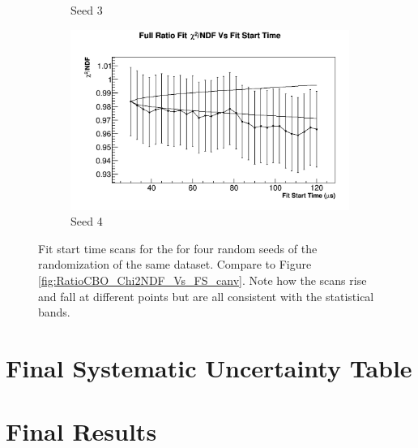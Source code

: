 \begin{figure}[]
\begin{subfigure}[t]{0.45\textwidth}
	    \caption{Seed 3}
    \end{subfigure}
    \begin{subfigure}[t]{0.45\textwidth}
	    \centering
		\includegraphics[width=\textwidth]{RatioCBO_Chi2NDF_Vs_FS_canv-Seed18}
	    \caption{Seed 4}
    \end{subfigure}%
\caption[RandomSeedFitStartScans]{Fit start time scans for the \chisq for four random seeds of the randomization of the same dataset. Compare to Figure \ref{fig:RatioCBO_Chi2NDF_Vs_FS_canv}. Note how the scans rise and fall at different points but are all consistent with the statistical bands.}
\label{fig:RandomSeedFitStartScans}
\end{figure}



\section{Final Systematic Uncertainty Table}

\section{Final Results}
